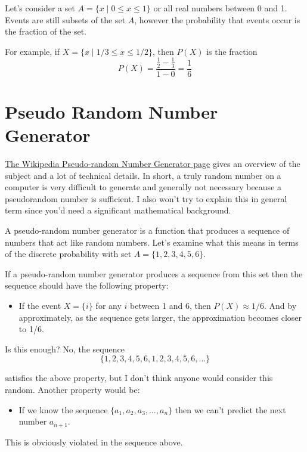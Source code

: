 Let's consider a set $A=\{x \; | \; 0 \leq x \leq 1\}$ or all real
numbers between 0 and 1. Events are still subsets of the set $A$,
however the probability that events occur is the fraction of the set.

For example, if $X=\{x \; | \; 1/3 \leq x \leq 1/2\}$, then $P(X)$
is the fraction
\[P(X) = \frac{\frac{1}{2}-\frac{1}{3}}{1-0}=\frac{1}{6}\]


\section{Pseudo Random Number Generator}

\href{https://en.wikipedia.org/wiki/Pseudorandom_number_generator}{The
Wikipedia Pseudo-random Number Generator page} gives an overview of the
subject and a lot of technical details. In short, a truly random number
on a computer is very difficult to generate and generally not necessary
because a pseudorandom number is sufficient. I also won't try to explain
this in general term since you'd need a significant mathematical
background.

A pseudo-random number generator is a function that produces a sequence
of numbers that act like random numbers. Let's examine what this means
in terms of the discrete probability with set $A=\{1,2,3,4,5,6\}$.

If a pseudo-random number generator produces a sequence from this set
then the sequence should have the following property:

\begin{itemize}

\item
  If the event $X=\{i\}$ for any $i$ between 1 and 6, then
  $P(X)\approx 1/6$. And by approximately, as the sequence gets
  larger, the approximation becomes closer to 1/6.
\end{itemize}

Is this enough? No, the sequence \[\{1,2,3,4,5,6,1,2,3,4,5,6,\ldots\}\]

satisfies the above property, but I don't think anyone would consider
this random. Another property would be:

\begin{itemize}

\item
  If we know the sequence $\{a_1,a_2,a_3,\ldots,a_n\}$ then we can't
  predict the next number $a_{n+1}$.
\end{itemize}

This is obviously violated in the sequence above.


